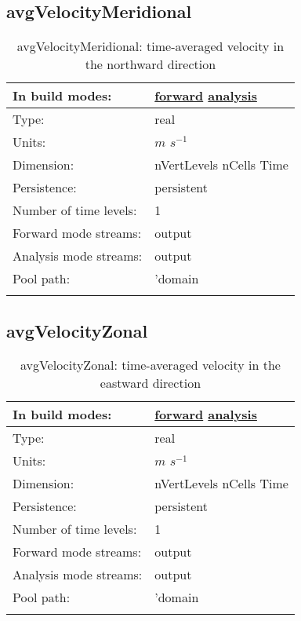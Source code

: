 \subsection[avgVelocityMeridional]{avgVelocityMeridional}
\label{subsec:var_sec_average_avgVelocityMeridional}
\begin{center}
\begin{longtable}{| p{2.0in} | p{4.0in} |}
        \hline 
        In build modes: & \hyperref[subsec:forward_var_tab_average]{forward} \hyperref[subsec:analysis_var_tab_average]{analysis} \\
        \hline 
        Type: & real \\
        \hline 
        Units: & $m$ $s^{-1}$ \\
        \hline 
        Dimension: & nVertLevels nCells Time \\
        \hline 
        Persistence: & persistent \\
        \hline 
        Number of time levels: & 1 \\
        \hline 
		 Forward mode streams: &  output \\
        \hline 
		 Analysis mode streams: &  output \\
        \hline 
            Pool path: & 'domain %
 \\
		 \hline 
    \caption{avgVelocityMeridional: time-averaged velocity in the northward direction}
\end{longtable}
\end{center}
\subsection[avgVelocityZonal]{avgVelocityZonal}
\label{subsec:var_sec_average_avgVelocityZonal}
\begin{center}
\begin{longtable}{| p{2.0in} | p{4.0in} |}
        \hline 
        In build modes: & \hyperref[subsec:forward_var_tab_average]{forward} \hyperref[subsec:analysis_var_tab_average]{analysis} \\
        \hline 
        Type: & real \\
        \hline 
        Units: & $m$ $s^{-1}$ \\
        \hline 
        Dimension: & nVertLevels nCells Time \\
        \hline 
        Persistence: & persistent \\
        \hline 
        Number of time levels: & 1 \\
        \hline 
		 Forward mode streams: &  output \\
        \hline 
		 Analysis mode streams: &  output \\
        \hline 
            Pool path: & 'domain %
 \\
		 \hline 
    \caption{avgVelocityZonal: time-averaged velocity in the eastward direction}
\end{longtable}
\end{center}
